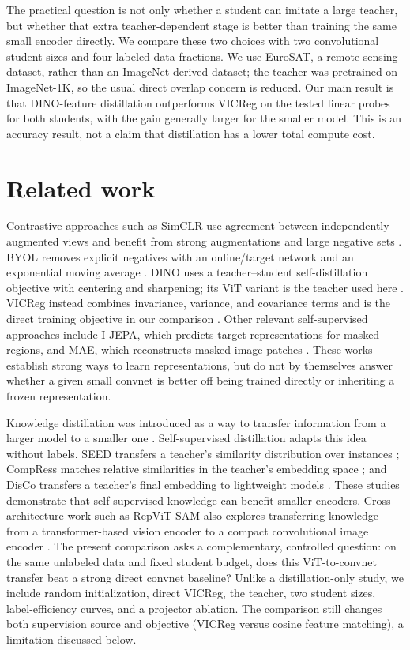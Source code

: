 \documentclass[10pt]{article}
\begin{document}
The practical question is not only whether a student can imitate a large
teacher, but whether that extra teacher-dependent stage is better than
training the same small encoder directly. We compare these two choices with
two convolutional student sizes and four labeled-data fractions. We use
EuroSAT, a remote-sensing dataset, rather than an ImageNet-derived dataset;
the teacher was pretrained on ImageNet-1K, so the usual direct overlap
concern is reduced. Our main result is that DINO-feature distillation
outperforms VICReg on the tested linear probes for both students, with the
gain generally larger for the smaller model. This is an accuracy result,
not a claim that distillation has a lower total compute cost.

\section{Related work}

Contrastive approaches such as SimCLR use agreement between independently
augmented views and benefit from strong augmentations and large negative
sets \cite{simclr}. BYOL removes explicit negatives with an online/target
network and an exponential moving average \cite{byol}. DINO uses a
teacher--student self-distillation objective with centering and sharpening;
its ViT variant is the teacher used here \cite{dino}. VICReg instead
combines invariance, variance, and covariance terms and is the direct
training objective in our comparison \cite{vicreg}. Other relevant
self-supervised approaches include I-JEPA, which predicts target
representations for masked regions, and MAE, which reconstructs masked
image patches \cite{ijepa,mae}. These works establish strong ways to learn
representations, but do not by themselves answer whether a given small
convnet is better off being trained directly or inheriting a frozen
representation.

Knowledge distillation was introduced as a way to transfer information
from a larger model to a smaller one \cite{hinton}. Self-supervised
distillation adapts this idea without labels. SEED transfers a teacher's
similarity distribution over instances \cite{seed}; CompRess matches
relative similarities in the teacher's embedding space \cite{compress};
and DisCo transfers a teacher's final embedding to lightweight models
\cite{disco}. These studies demonstrate that self-supervised knowledge can
benefit smaller encoders. Cross-architecture work such as RepViT-SAM also
explores transferring knowledge from a transformer-based vision encoder
to a compact convolutional image encoder \cite{repvitsam}. The present
comparison asks a complementary, controlled question: on the same
unlabeled data and fixed student budget, does this ViT-to-convnet transfer
beat a strong direct convnet baseline? Unlike a distillation-only study,
we include random initialization, direct VICReg, the teacher, two student
sizes, label-efficiency curves, and a projector ablation. The comparison
still changes both supervision source and objective (VICReg versus cosine
feature matching), a limitation discussed below.
\end{document}
